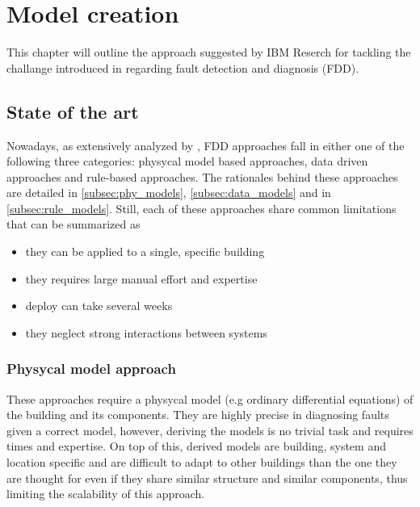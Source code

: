 \chapter{Model creation} \label{ch:model}

This chapter will outline the approach suggested by IBM Reserch for tackling the challange introduced in \textbf{} regarding fault detection and diagnosis (FDD). %

\section{State of the art}
Nowadays, as extensively analyzed by \textcite{methods_for_diagnostic}, FDD approaches fall in either one of the following three categories: physycal model based approaches, data driven approaches and rule-based approaches. The rationales behind these approaches are detailed in \autoref{subsec:phy_models}, \autoref{subsec:data_models} and in \autoref{subsec:rule_models}. Still, each of these approaches share common limitations that can be summarized as
\begin{itemize}
  \item they can be applied to a single, specific building
  \item they requires large manual effort and expertise
  \item deploy can take several weeks
  \item they neglect strong interactions between systems
\end{itemize}

\subsection{Physycal model approach} \label{subsec:phy_models}
These approaches require a physycal model (e.g ordinary differential equations) of the building and its components. They are highly precise in diagnosing faults given a correct model, however, deriving the models is no trivial task and requires times and expertise. On top of this, derived models are building, system and location specific and are difficult to adapt to other buildings than the one they are thought for even if they share similar structure and similar components, thus limiting the scalability of this approach.

